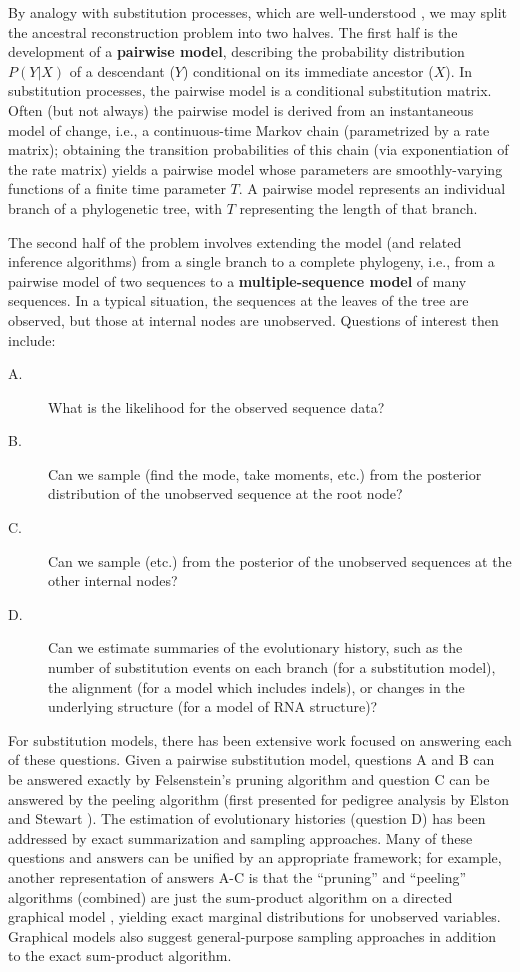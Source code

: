 \documentclass[10pt]{article}
\begin{document}
By analogy with substitution processes, which are well-understood \cite{Felsenstein2003},
we may split the ancestral reconstruction problem into two halves.
The first half is the development of a {\bf pairwise model},
describing the probability distribution $P(Y|X)$ of a descendant ($Y$) conditional on its immediate ancestor ($X$).
In substitution processes, the pairwise model is a conditional substitution matrix.
Often (but not always) the pairwise model is derived from an instantaneous model of change,
i.e., a continuous-time Markov chain (parametrized by a rate matrix);
obtaining the transition probabilities of this chain (via exponentiation of the rate matrix)
yields a pairwise model whose parameters are smoothly-varying functions of a finite time parameter $T$.
A pairwise model represents an individual branch of a phylogenetic tree, with $T$ representing the length of that branch.

The second half of the problem involves extending the model (and related inference algorithms) from a single branch to a complete phylogeny,
i.e., from a pairwise model of two sequences to a {\bf multiple-sequence model} of many sequences.
In a typical situation, the sequences at the leaves of the tree are observed, but those at internal nodes are unobserved.
Questions of interest then include:
\begin{description}
\item[A.] What is the likelihood for the observed sequence data?
\item[B.] Can we sample (find the mode, take moments, etc.) from the posterior distribution of the unobserved sequence at the root node?
\item[C.] Can we sample (etc.) from the posterior of the unobserved sequences at the other internal nodes?
\item[D.] Can we estimate summaries of the evolutionary history, such as
  the number of substitution events on each branch (for a substitution
  model), the alignment (for a model which includes indels), or
  changes in the underlying structure (for a model of RNA structure)?
\end{description}

For substitution models, there has been extensive work focused on answering each of these questions.
Given a pairwise substitution model, questions A and B can be
answered exactly by Felsenstein's pruning algorithm
\cite{Felsenstein81} and question C can be answered by the peeling
algorithm (first presented for pedigree analysis by Elston and Stewart \cite{ElstonStewart71}).
The estimation of evolutionary histories (question D) has been
addressed by exact summarization \cite{HolmesRubin2002b} and sampling
\cite{Nielsen2001} approaches.
Many of these questions and answers can be unified by an
appropriate framework;
for example, another representation of answers A-C
is that the ``pruning'' and ``peeling'' algorithms (combined) are just
the sum-product algorithm on a directed graphical model \cite{Pearl82},
yielding exact marginal distributions for unobserved variables.
Graphical models also suggest general-purpose sampling approaches
in addition to the exact sum-product algorithm.
\end{document}
